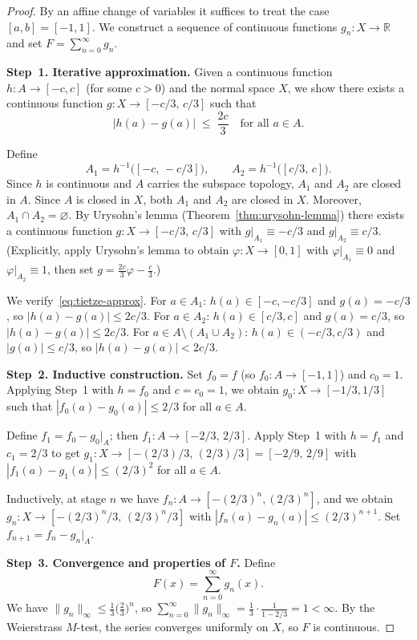 \documentclass[11pt,a4paper,twoside]{book}
\theoremstyle{remark}
\theoremstyle{definition}
\theoremstyle{definition}
\begin{document}
\begin{proof}
By an affine change of variables it suffices to treat the case
$[a,b]=[-1,1]$.  We construct a sequence of continuous functions
$g_n\colon X\to\mathbb{R}$ and set $F=\sum_{n=0}^{\infty}g_n$.

\medskip
\textbf{Step~1.  Iterative approximation.}
Given a continuous function $h\colon A\to[-c,c]$ (for some $c>0$) and
the normal space $X$, we show there exists a continuous function
$g\colon X\to[-c/3,\,c/3]$ such that
\begin{equation}
  \label{eq:tietze-approx}
  |h(a) - g(a)| \;\le\; \frac{2c}{3}
  \quad\text{for all }a\in A.
\end{equation}

Define
\[
  A_1 = h^{-1}\bigl([-c,\,-c/3]\bigr),\qquad
  A_2 = h^{-1}\bigl([c/3,\,c]\bigr).
\]
Since $h$ is continuous and $A$ carries the subspace topology, $A_1$
and $A_2$ are closed in $A$.  Since $A$ is closed in $X$, both $A_1$
and $A_2$ are closed in $X$.  Moreover, $A_1\cap A_2=\varnothing$.  By
Urysohn's lemma (Theorem~\ref{thm:urysohn-lemma}) there exists a
continuous function $g\colon X\to[-c/3,\,c/3]$ with $g|_{A_1}\equiv
-c/3$ and $g|_{A_2}\equiv c/3$.  (Explicitly, apply Urysohn's lemma to
obtain $\varphi\colon X\to[0,1]$ with $\varphi|_{A_1}\equiv 0$ and
$\varphi|_{A_2}\equiv 1$, then set $g = \frac{2c}{3}\varphi - \frac{c}{3}$.)

We verify~\eqref{eq:tietze-approx}.  For $a\in A_1$: $h(a)\in[-c,-c/3]$
and $g(a)=-c/3$, so $|h(a)-g(a)|\le 2c/3$.  For $a\in A_2$:
$h(a)\in[c/3,c]$ and $g(a)=c/3$, so $|h(a)-g(a)|\le 2c/3$.  For
$a\in A\setminus(A_1\cup A_2)$: $h(a)\in(-c/3,c/3)$ and
$|g(a)|\le c/3$, so $|h(a)-g(a)|< 2c/3$.

\medskip
\textbf{Step~2.  Inductive construction.}
Set $f_0=f$ (so $f_0\colon A\to[-1,1]$) and $c_0=1$.  Applying Step~1
with $h=f_0$ and $c=c_0=1$, we obtain $g_0\colon X\to[-1/3,1/3]$
such that $|f_0(a)-g_0(a)|\le 2/3$ for all $a\in A$.

Define $f_1 = f_0 - g_0|_A$; then $f_1\colon A\to[-2/3,\,2/3]$.
Apply Step~1 with $h=f_1$ and $c_1 = 2/3$ to get
$g_1\colon X\to[-(2/3)/3,\,(2/3)/3]=[-2/9,\,2/9]$ with
$|f_1(a)-g_1(a)|\le (2/3)^2$ for all $a\in A$.

Inductively, at stage $n$ we have $f_n\colon A\to[-(2/3)^n,(2/3)^n]$,
and we obtain $g_n\colon X\to[-(2/3)^n/3,\,(2/3)^n/3]$ with
$|f_n(a)-g_n(a)|\le(2/3)^{n+1}$.  Set $f_{n+1}=f_n-g_n|_A$.

\medskip
\textbf{Step~3.  Convergence and properties of $F$.}
Define
\[
  F(x) = \sum_{n=0}^{\infty} g_n(x).
\]
We have $\|g_n\|_\infty \le \frac{1}{3}\bigl(\frac{2}{3}\bigr)^n$, so
$\sum_{n=0}^{\infty}\|g_n\|_\infty = \frac{1}{3}\cdot\frac{1}
{1-2/3}=1<\infty$.  By the Weierstrass $M$-test, the series converges
uniformly on $X$, so $F$ is continuous.


\end{proof}
\end{document}
